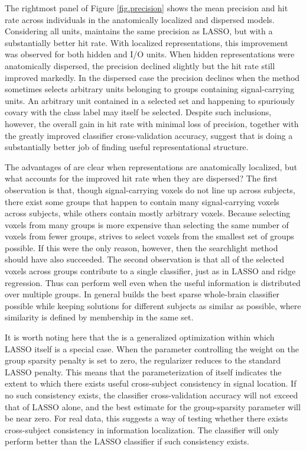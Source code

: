 The rightmost panel of Figure \ref{fig.precision} shows the mean precision and hit rate across individuals in the anatomically localized and dispersed models. Considering all units, \soslasso maintains the same precision as LASSO, but with a substantially better hit rate. With localized representations, this improvement was observed for both hidden and I/O units. When hidden representations were anatomically dispersed, the precision declined slightly but the hit rate still improved markedly. In the dispersed case the precision declines when the method sometimes selects arbitrary units belonging to groups containing signal-carrying units. An arbitrary unit contained in a selected set and happening to spuriously covary with the class label may itself be selected. Despite such inclusions, however, the overall gain in hit rate with minimal loss of precision, together with the greatly improved classifier cross-validation accuracy, suggest that \soslasso is doing a substantially better job of finding useful representational structure.

The advantages of \soslasso are clear when representations are anatomically localized, but what accounts for the improved hit rate when they are dispersed? The first observation is that, though signal-carrying voxels do not line up across subjects, there exist some groups that happen to contain many signal-carrying voxels across subjects, while others contain mostly arbitrary voxels. Because selecting voxels from many groups is more expensive than selecting the same number of voxels from fewer groups, \soslasso strives to select voxels from the smallest set of groups possible. If this were the only reason, however, then the searchlight method should have also succeeded. The second observation is that all of the selected voxels across groups contribute to a single classifier, just as in LASSO and ridge regression. Thus \soslasso can perform well even when the useful information is distributed over multiple groups. In general \soslasso builds the best sparse whole-brain classifier possible while keeping solutions for different subjects as similar as possible, where similarity is defined by membership in the same set.

It is worth noting here that the \soslasso is a generalized optimization within which LASSO itself is a special case. When the parameter controlling the weight on the group sparsity penalty is set to zero, the regularizer reduces to the standard LASSO penalty. This means that the parameterization of \soslasso itself indicates the extent to which there exists useful cross-subject consistency in signal location. If no such consistency exists, the classifier cross-validation accuracy will not exceed that of LASSO alone, and the best estimate for the group-sparsity parameter will be near zero. For real data, this suggests a way of testing whether there exists cross-subject consistency in information localization. The \soslasso classifier will only perform better than the LASSO classifier if such consistency exists.

